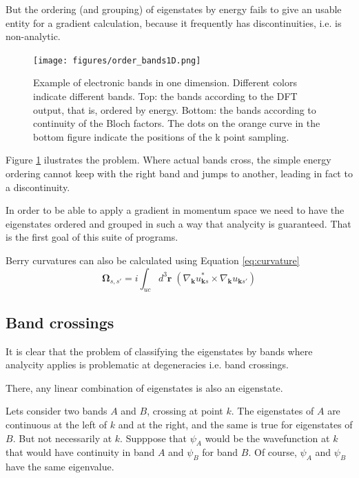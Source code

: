 \documentclass[a4paper,12pt]{report}
\begin{document}
But the ordering (and grouping) of eigenstates by energy fails to give an usable entity for a gradient calculation,
because it frequently has discontinuities, i.e. is non-analytic.
\begin{figure}
 \centering
 \texttt{[image: figures/order\_bands1D.png]}
 \caption{Example of electronic bands in one dimension.
 Different colors indicate different bands.
 Top: the bands according to the DFT output, that is, ordered by energy.
 Bottom: the bands according to continuity of the Bloch factors.
 The dots on the orange curve in the bottom figure indicate the positions of the k point sampling.}
 \label{fig:orderbands}
\end{figure}
Figure \ref{fig:orderbands} ilustrates the problem.
Where actual bands cross, the simple energy ordering cannot keep with the right band and jumps to another,
leading in fact to a discontinuity.

In order to be able to apply a gradient in momentum space we need to have the eigenstates ordered and grouped
in such a way that analycity is guaranteed.
That is the first goal of this suite of programs.

Berry curvatures can also be calculated using Equation \ref{eq:curvature} \cite{Gradhand_2012}
\begin{equation}\label{eq:curvature}
 \pmb{\Omega}_{s,s'} = i\int_{uc}d^3\pmb{r}\;(\nabla_{\pmb{k}}u_{\pmb{k}s}^* \times \nabla_{\pmb{k}} u_{\pmb{k}s'})
\end{equation}

\subsection*{Band crossings}\label{ssec:bandcrossings}

It is clear that the problem of classifying the eigenstates by bands where analycity applies is
 problematic at degeneracies i.e. band crossings.

There, any linear combination of eigenstates is also an eigenstate.

Lets consider two bands $A$ and $B$, crossing at point $k$.
The eigenstates of $A$ are continuous at the left of $k$ and at the right, and the same is true for eigenstates of $B$.
But not necessarily at $k$.
Supppose that $\psi_A$ would be the wavefunction at $k$ that would have continuity in band $A$
and $\psi_B$ for band $B$. Of course, $\psi_A$ and $\psi_B$ have the same eigenvalue.
\end{document}
